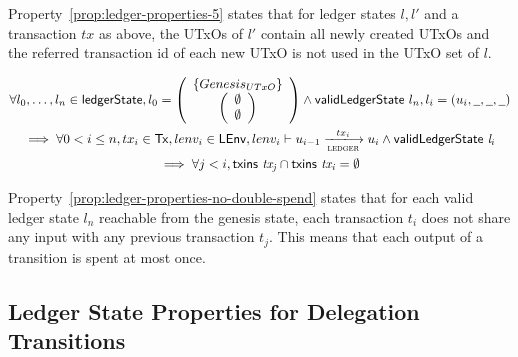 Property~\ref{prop:ledger-properties-5} states that for ledger states $l, l'$
and a transaction $tx$ as above, the UTxOs of $l'$ contain all newly created
UTxOs and the referred transaction id of each new UTxO is not used in the UTxO
set of $l$.

\begin{property}
  \begin{multline*}
    \forall l_{0},\ldots,l_{n} \in \ledgerState, l_{0} =
    \left(
      \begin{array}{c}
        \left\{
        \genesisUTxO
        \right\} \\
        \left(
        \begin{array}{c}
          \emptyset\\
          \emptyset
        \end{array}
        \right)
      \end{array}
    \right) \wedge \applyFun{validLedgerState} l_{n}, l_{i}=(u_{i},\wcard,\wcard,\wcard)\\
    \implies \forall 0 < i \leq n, tx_{i} \in \Tx, lenv_{i}\in\LEnv,
    lenv_{i} \vdash u_{i-1}
    \trans{ledger}{tx_{i}} u_{i} \wedge \applyFun{validLedgerState} l_{i} \\
    \implies \forall j < i, \applyFun{txins}{tx_{j}} \cap
    \applyFun{txins}{tx_{i}} = \emptyset
  \end{multline*}
  \label{prop:ledger-properties-no-double-spend}
\end{property}

Property~\ref{prop:ledger-properties-no-double-spend} states that for each valid
ledger state $l_{n}$ reachable from the genesis state, each transaction $t_{i}$
does not share any input with any previous transaction $t_{j}$. This means that
each output of a transition is spent at most once.

\subsection{Ledger State Properties for Delegation Transitions}
\label{sec:ledg-prop-deleg}

